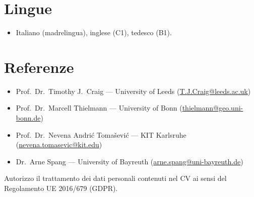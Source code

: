 \documentclass[11pt,a4paper,sans]{moderncv}
\begin{document}
\section{Lingue}
\vspace{1pt}
\begin{itemize}
\item Italiano (madrelingua), inglese (C1), tedesco (B1).
\end{itemize}


\section{Referenze}
\vspace{1pt}
\begin{itemize}
\item Prof.\ Dr.\ Timothy J.\ Craig --- University of Leeds (\href{mailto:T.J.Craig@leeds.ac.uk}{T.J.Craig@leeds.ac.uk})
\item Prof.\ Dr.\ Marcell Thielmann --- University of Bonn (\href{mailto:thielmann@geo.uni-bonn.de}{thielmann@geo.uni-bonn.de})
\item Prof.\ Dr.\ Nevena Andri\'c Toma\v{s}evi\'c --- KIT Karlsruhe (\href{mailto:nevena.tomasevic@kit.edu}{nevena.tomasevic@kit.edu})
\item Dr.\ Arne Spang --- University of Bayreuth (\href{mailto:arne.spang@uni-bayreuth.de}{arne.spang@uni-bayreuth.de})
\end{itemize}

\vspace{6pt}
{\scriptsize Autorizzo il trattamento dei dati personali contenuti nel CV ai sensi del Regolamento UE 2016/679 (GDPR).}
\end{document}

